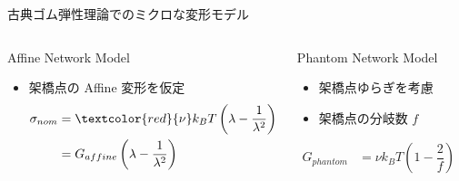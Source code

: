 \begin{columns}[totalwidth=.85\linewidth]
		\begin{itembox}[l]{古典ゴム弾性理論でのミクロな変形モデル}
			\begin{columns}[T, onlytextwidth]
					\begin{itembox}[l]{Affine Network Model}
						\begin{itemize}
							\item 架橋点の Affine 変形を仮定
								\begin{align*}
									\sigma_{nom} &= \textcolor{red}{\nu} k_B T \left(\lambda - \dfrac{1}{\lambda^2}\right) \\
									&= G_{affine} \left(\lambda - \dfrac{1}{\lambda^2}\right)
								\end{align*}
						\end{itemize}
					\end{itembox}
					\begin{itembox}[l]{Phantom Network Model}
						\begin{itemize}
							\item \alert{架橋点ゆらぎ}を考慮
							\item 架橋点の分岐数 $f$
						\end{itemize}
						\begin{align*}
							G_{phantom} &= \nu k_B T \left(1 - \dfrac{2}{f}\right) \\
						\end{align*}
					\end{itembox}
			\end{columns}     
		\end{itembox}





\end{columns}
